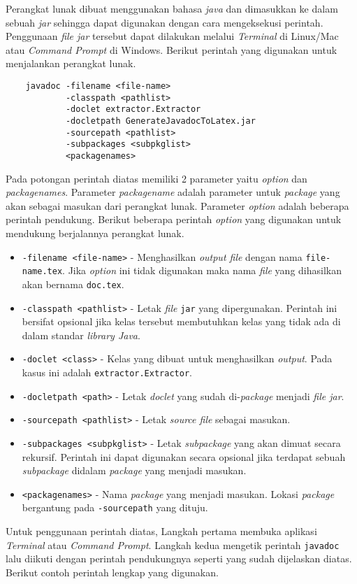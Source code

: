 Perangkat lunak dibuat menggunakan bahasa {\it java} dan dimasukkan ke dalam sebuah {\it jar} sehingga dapat digunakan dengan cara mengeksekusi perintah. Penggunaan {\it file jar} tersebut dapat dilakukan melalui {\it Terminal} di Linux/Mac atau {\it Command Prompt} di Windows. Berikut perintah yang digunakan untuk menjalankan perangkat lunak.
\begin{verbatim}
	javadoc -filename <file-name>
	        -classpath <pathlist>
	        -doclet extractor.Extractor
	        -docletpath GenerateJavadocToLatex.jar
	        -sourcepath <pathlist>
	        -subpackages <subpkglist>
	        <packagenames>
\end{verbatim}
Pada potongan perintah diatas memiliki 2 parameter yaitu {\it option} dan {\it packagenames}. Parameter {\it packagename} adalah parameter untuk {\it package} yang akan sebagai masukan dari perangkat lunak. Parameter {\it option} adalah beberapa perintah pendukung. Berikut beberapa perintah {\it option} yang digunakan untuk mendukung berjalannya perangkat lunak.
\begin{itemize}
	\item {\tt -filename <file-name>} - Menghasilkan {\it output file} dengan nama {\tt file-name.tex}. Jika {\it option} ini tidak digunakan maka nama {\it file} yang dihasilkan akan bernama {\tt doc.tex}.
	\item {\tt -classpath <pathlist>} - Letak {\it file} {\tt jar} yang dipergunakan. Perintah ini bersifat opsional jika kelas tersebut membutuhkan kelas yang tidak ada di dalam standar {\it library Java}.
	\item {\tt -doclet <class>} - Kelas yang dibuat untuk menghasilkan {\it output}. Pada kasus ini adalah {\tt extractor.Extractor}.
	\item {\tt -docletpath <path>} - Letak {\it doclet} yang sudah di-{\it package} menjadi {\it file jar}.
	\item {\tt -sourcepath <pathlist>} - Letak {\it source file} sebagai masukan. 
	\item {\tt -subpackages <subpkglist>} - Letak {\it subpackage} yang akan dimuat secara rekursif. Perintah ini dapat digunakan secara opsional jika terdapat sebuah {\it subpackage} didalam {\it package} yang menjadi masukan.
	\item {\tt <packagenames>} - Nama {\it package} yang menjadi masukan. Lokasi {\it package} bergantung pada {\tt -sourcepath} yang dituju.
\end{itemize}

Untuk penggunaan perintah diatas, Langkah pertama membuka aplikasi {\it Terminal} atau {\it Command Prompt}. Langkah kedua mengetik perintah {\tt javadoc} lalu diikuti dengan perintah pendukungnya seperti yang sudah dijelaskan diatas. Berikut contoh perintah lengkap yang digunakan.

